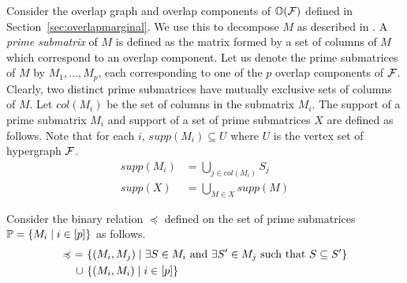 Consider the overlap graph and overlap components of $\mathbb O({\cal F})$
defined in Section~\ref{sec:overlapmarginal}.  We use this to
decompose $M$ as described in \cite{wlh02,nsnrs09}.  A {\em prime
  submatrix} of $M$ is defined as the matrix formed by a set of
columns of $M$ which correspond to an overlap component.  Let us
denote the prime submatrices of $M$ by $M_1,\ldots,M_p$, each
corresponding to one of the $p$ overlap components of ${\cal F}$. Clearly,
two distinct prime submatrices have mutually exclusive sets of columns
of $M$.  Let $col(M_i)$ be the set of columns in the submatrix $M_i$.
The support of a prime submatrix $M_i$ and support of a
set of prime submatrices $X$ are defined as follows. Note that for each $i$,
$supp(M_i) \subseteq U$ where $U$ is the vertex set of hypergraph ${\cal F}$.
\begin{align*}
supp(M_i) &= \displaystyle \bigcup_{j \in col(M_i)}S_j\\  
supp(X) &= \displaystyle  \bigcup_{M \in X} supp(M)
\end{align*}





\def \primeless {\preccurlyeq}
\noindent
Consider the binary relation $\primeless$ defined on the set of
prime submatrices $\mathbb P = \{M_i \mid i \in [p]\}$ as follows.
\begin{align*}
  \primeless \ = \ &\{(M_i,M_j) \mid \exists S \in
  M_i \text{ and } \exists S' \in M_j \text{ \stt\ } S \subseteq S'\} \\
  \cup \  &\{(M_i,M_i) \mid i \in [p]\}
\end{align*}

